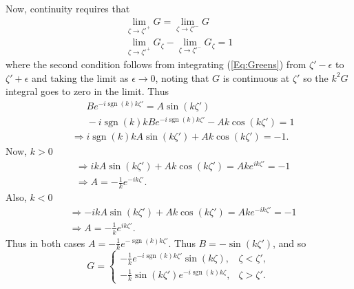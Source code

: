 \documentclass[12pt]{article}
\DeclareMathOperator{\sgn}{sgn}
\begin{document}
Now, continuity requires that 
\begin{align*}
\lim_{\zeta\to\zeta'^+} G = \lim_{\zeta\to\zeta'^-} G \\
\lim_{\zeta\to\zeta'^+} G_\zeta - \lim_{\zeta\to\zeta'^-} G_\zeta = 1 
\end{align*}
where the second condition follows from integrating (\ref{Eq:Greens}) from $\zeta'-\epsilon$ to $\zeta'+\epsilon$ and taking the limit as $\epsilon\to 0$, noting that $G$ is continuous at $\zeta'$ so the $k^2 G$ integral goes to zero in the limit.  Thus 
\begin{align*}
&\phantom{\Rightarrow} Be^{-i\sgn(k)k\zeta'} = A\sin(k\zeta') \\
&\phantom{\Rightarrow} -i\sgn(k)k Be^{-i\sgn(k)k\zeta'} - Ak\cos(k\zeta') = 1 \\
&\Rightarrow i\sgn(k)k A\sin(k\zeta') + Ak\cos(k\zeta') = -1.
\end{align*}
Now, $k>0$
\begin{align*}
&\Rightarrow ik A\sin(k\zeta') + Ak\cos(k\zeta') = A k e^{ik\zeta'} = -1 \\
& \Rightarrow A = -\frac{1}{k} e^{-ik\zeta'}.
\end{align*}
Also, $k<0$
\begin{align*}
&\Rightarrow -ik A\sin(k\zeta') + Ak\cos(k\zeta') = A k e^{-ik\zeta'} = -1 \\
& \Rightarrow A = -\frac{1}{k} e^{ik\zeta'}.
\end{align*}
Thus in both cases $A = -\frac{1}{k} e^{-\sgn(k) k \zeta'}$. Thus $B=-\sin(k\zeta')$, and so
\begin{equation*}
G=
\begin{cases} -\frac{1}{k} e^{-i\sgn(k)k\zeta'} \sin(k\zeta), & \zeta<\zeta', \\
-\frac{1}{k}\sin(k\zeta')e^{-i\sgn(k)k\zeta}, & \zeta>\zeta'. 
\end{cases}
\end{equation*}
\end{document}
